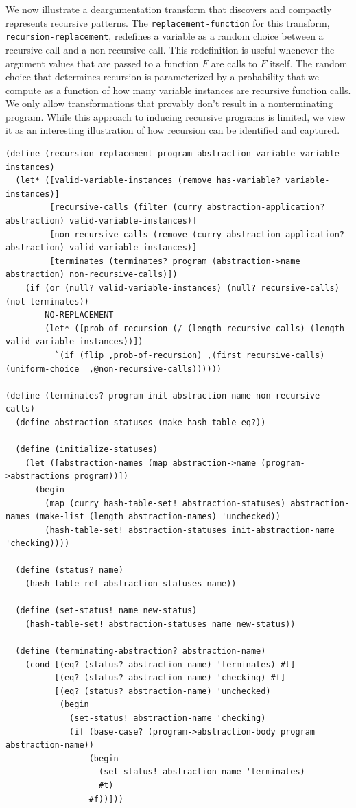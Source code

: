 \documentclass[a4paper,10pt]{article}
\begin{document}
We now illustrate a deargumentation transform that discovers and compactly represents recursive patterns. The \texttt{replacement-function} for this transform, \texttt{recursion-replacement}, redefines a variable as a random choice between a recursive call and a non-recursive call. This redefinition is useful whenever the argument values that are passed to a function $F$ are calls to $F$ itself. The random choice that determines recursion is parameterized by a probability that we compute as a function of how many variable instances are recursive function calls. We only allow transformations that provably don't result in a nonterminating program. While this approach to inducing recursive programs is limited, we view it as an interesting illustration of how recursion can be identified and captured.
\begin{lstlisting}[frame=trbl]
(define (recursion-replacement program abstraction variable variable-instances)
  (let* ([valid-variable-instances (remove has-variable? variable-instances)]
         [recursive-calls (filter (curry abstraction-application? abstraction) valid-variable-instances)]
         [non-recursive-calls (remove (curry abstraction-application? abstraction) valid-variable-instances)]
         [terminates (terminates? program (abstraction->name abstraction) non-recursive-calls)]) 
    (if (or (null? valid-variable-instances) (null? recursive-calls) (not terminates))
        NO-REPLACEMENT
        (let* ([prob-of-recursion (/ (length recursive-calls) (length valid-variable-instances))])
          `(if (flip ,prob-of-recursion) ,(first recursive-calls) (uniform-choice  ,@non-recursive-calls))))))

(define (terminates? program init-abstraction-name non-recursive-calls)
  (define abstraction-statuses (make-hash-table eq?))

  (define (initialize-statuses)
    (let ([abstraction-names (map abstraction->name (program->abstractions program))])
      (begin
        (map (curry hash-table-set! abstraction-statuses) abstraction-names (make-list (length abstraction-names) 'unchecked))
        (hash-table-set! abstraction-statuses init-abstraction-name 'checking))))

  (define (status? name)
    (hash-table-ref abstraction-statuses name))

  (define (set-status! name new-status)
    (hash-table-set! abstraction-statuses name new-status))
  
  (define (terminating-abstraction? abstraction-name)
    (cond [(eq? (status? abstraction-name) 'terminates) #t]
          [(eq? (status? abstraction-name) 'checking) #f]
          [(eq? (status? abstraction-name) 'unchecked)
           (begin
             (set-status! abstraction-name 'checking)
             (if (base-case? (program->abstraction-body program abstraction-name))
                 (begin
                   (set-status! abstraction-name 'terminates)
                   #t)
                 #f))]))
  

\end{lstlisting}
\end{document}
